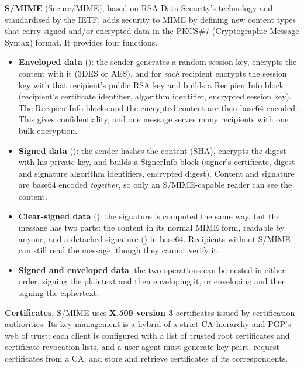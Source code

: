 \textbf{S/MIME} (Secure/MIME), based on RSA Data Security's technology and standardised by the IETF, adds security to MIME by defining new content types that carry signed and/or encrypted data in the PKCS\#7 (Cryptographic Message Syntax) format. It provides four functions.
\begin{itemize}
  \item \textbf{Enveloped data} (): the sender generates a random session key, encrypts the content with it (3DES or AES), and for \emph{each} recipient encrypts the session key with that recipient's public RSA key and builds a RecipientInfo block (recipient's certificate identifier, algorithm identifier, encrypted session key). The RecipientInfo blocks and the encrypted content are then base64 encoded. This gives confidentiality, and one message serves many recipients with one bulk encryption.
  \item \textbf{Signed data} (): the sender hashes the content (SHA), encrypts the digest with his private key, and builds a SignerInfo block (signer's certificate, digest and signature algorithm identifiers, encrypted digest). Content and signature are base64 encoded \emph{together}, so only an S/MIME-capable reader can see the content.
  \item \textbf{Clear-signed data} (): the signature is computed the same way, but the message has two parts: the content in its normal MIME form, readable by anyone, and a detached signature () in base64. Recipients without S/MIME can still read the message, though they cannot verify it.
  \item \textbf{Signed and enveloped data}: the two operations can be nested in either order, signing the plaintext and then enveloping it, or enveloping and then signing the ciphertext.
\end{itemize}

\textbf{Certificates.} S/MIME uses \textbf{X.509 version 3} certificates issued by certification authorities. Its key management is a hybrid of a strict CA hierarchy and PGP's web of trust: each client is configured with a list of trusted root certificates and certificate revocation lists, and a user agent must generate key pairs, request certificates from a CA, and store and retrieve certificates of its correspondents.


